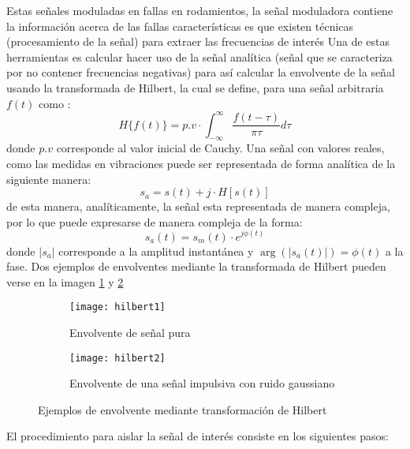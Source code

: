 			Estas señales moduladas en fallas en rodamientos, la señal moduladora contiene la información acerca de las fallas características es que existen técnicas (procesamiento de la señal) para extraer las frecuencias de interés Una de estas herramientas es calcular hacer uso de la señal analítica (señal que se caracteriza por no contener frecuencias negativas) para así calcular la envolvente de la señal usando la transformada de Hilbert, la cual se define, para una señal arbitraria $f(t)$ como \cite{Boashash1992}:
			\begin{equation}
				H \{f(t)\} = p.v \cdot \int_{-\infty}^{\infty} \frac{f(t-\tau)}{\pi \tau} d\tau
			\end{equation}
			donde $p.v$ corresponde al valor inicial de Cauchy. Una señal con valores reales, como las medidas en vibraciones puede ser representada de forma analítica de la siguiente manera:\\
			\begin{equation}
				s_{a}=s(t)+j \cdot H[s(t)]
			\end{equation}
			de esta manera, analíticamente, la señal esta representada de manera compleja, por lo que puede expresarse de manera compleja de la forma:\\
			\begin{equation}
				s_{a}(t) = s_{m}(t) \cdot e^{j\phi (t)}			
			\end{equation}
			donde $|s_{a}|$ corresponde a la amplitud instantánea y $\arg\left (|s_{a}(t)|\right )=\phi(t)$ a la fase. Dos ejemplos de envolventes mediante la transformada de Hilbert pueden verse en la imagen \ref{fig:hilbert1} y \ref{fig:hilbert2}
			\begin{figure}[H]
				\centering
				\begin{subfigure}[b]{\linewidth}
					\texttt{[image: hilbert1]}
					\caption{Envolvente de señal pura}
					\label{fig:hilbert1}
				\end{subfigure}
				\begin{subfigure}[b]{\linewidth}
					\texttt{[image: hilbert2]}
					\caption{Envolvente de una señal impulsiva con ruido gaussiano}
					\label{fig:hilbert2}
				\end{subfigure}
				\caption{Ejemplos de envolvente mediante transformación de Hilbert}
				\label{fig:hilbert}						
			\end{figure}
		El procedimiento para aislar la señal de interés consiste en los siguientes pasos:
